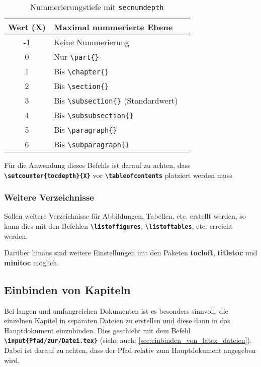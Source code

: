 \begin{table}[H]
  \centering
  \begin{tabular}{cll}
    \toprule
    \textbf{Wert (X)} & \textbf{Maximal nummerierte Ebene}                        \\
    \midrule
    -1                & Keine Nummerierung                                        \\
    0                 & Nur \texttt{\textbackslash part\{\}}                      \\
    1                 & Bis \texttt{\textbackslash chapter\{\}}                   \\
    2                 & Bis \texttt{\textbackslash section\{\}}                   \\
    3                 & Bis \texttt{\textbackslash subsection\{\}} (Standardwert) \\
    4                 & Bis \texttt{\textbackslash subsubsection\{\}}             \\
    5                 & Bis \texttt{\textbackslash paragraph\{\}}                 \\
    6                 & Bis \texttt{\textbackslash subparagraph\{\}}              \\
    \bottomrule
  \end{tabular}
  \caption{Nummerierungstiefe mit \texttt{secnumdepth}}
  \label{tab:secnumdepth}
\end{table}

Für die Anwendung dieses Befehls ist darauf zu achten, dass \textbf{\texttt{\textbackslash setcounter\{tocdepth\}\{X\}}} vor \textbf{\texttt{\textbackslash tableofcontents}} platziert werden muss.

\subsubsection{Weitere Verzeichnisse}
Sollen weitere Verzeichnisse für Abbildungen, Tabellen, etc. erstellt werden, so kann dies mit den Befehlen \textbf{\texttt{\textbackslash listoffigures}}, \textbf{\texttt{\textbackslash listoftables}}, etc. erreicht werden.

Darüber hinaus sind weitere Einstellungen mit den Paketen \textbf{tocloft}, \textbf{titletoc} und \textbf{minitoc} möglich.

\subsection{Einbinden von Kapiteln}
Bei langen und umfangreichen Dokumenten ist es besonders sinnvoll, die einzelnen Kapitel in separaten Dateien zu erstellen und diese dann in das Hauptdokument einzubinden. Dies geschieht mit dem Befehl \textbf{\texttt{\textbackslash input\{Pfad/zur/Datei.tex\}}} (siehe auch: \ref{sec:einbinden_von_latex_dateien}). Dabei ist darauf zu achten, dass der Pfad relativ zum Hauptdokument angegeben wird.

